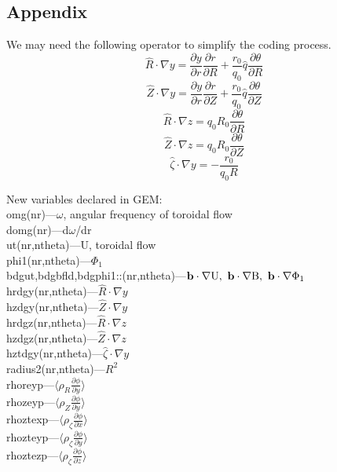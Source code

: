 \documentclass[12pt]{article}
\begin{document}
\begin{CJK*}{UTF8}{gbsn}
\section*{Appendix}\label{app}
We may need the following operator to simplify the coding process.
\begin{equation*}
    \hat{R}\cdot\nabla y = \frac{\partial y}{\partial r}\frac{\partial r}{\partial R} + \frac{r_0}{q_0}\hat{q}\frac{\partial \theta}{\partial R}
\end{equation*}
\begin{equation*}
    \hat{Z}\cdot\nabla y = \frac{\partial y}{\partial r}\frac{\partial r}{\partial Z} + \frac{r_0}{q_0}\hat{q}\frac{\partial \theta}{\partial Z}
\end{equation*}
\begin{equation*}
    \hat{R}\cdot\nabla z = q_0R_0\frac{\partial \theta}{\partial R}
\end{equation*}
\begin{equation*}
    \hat{Z}\cdot\nabla z = q_0R_0\frac{\partial \theta}{\partial Z}
\end{equation*}
\begin{equation*}
    \hat{\zeta}\cdot\nabla y = -\frac{r_0}{q_0R}
\end{equation*}

New variables declared in GEM:\\
omg(nr)---$\omega$, angular frequency of toroidal flow\\
domg(nr)---d$\omega$/dr\\
ut(nr,ntheta)---U, toroidal flow\\
phi1(nr,ntheta)---$\Phi_1$\\
bdgut,bdgbfld,bdgphi1::(nr,ntheta)---${\bf b}\cdot\nabla{\rm U},\ {\bf b}\cdot\nabla{\rm B},\ {\bf b}\cdot\nabla{\rm \Phi_1}$\\
hrdgy(nr,ntheta)---$\hat{R}\cdot\nabla y$\\
hzdgy(nr,ntheta)---$\hat{Z}\cdot\nabla y$\\
hrdgz(nr,ntheta)---$\hat{R}\cdot\nabla z$\\
hzdgz(nr,ntheta)---$\hat{Z}\cdot\nabla z$\\
hztdgy(nr,ntheta)---$\hat{\zeta}\cdot\nabla y$\\
radius2(nr,ntheta)---$R^2$\\
rhoreyp---$\big\langle\rho_R\frac{\partial\phi}{\partial y}\big\rangle$\\
rhozeyp---$\big\langle\rho_Z\frac{\partial\phi}{\partial y}\big\rangle$\\
rhoztexp---$\big\langle\rho_\zeta\frac{\partial\phi}{\partial x}\big\rangle$\\
rhozteyp---$\big\langle\rho_\zeta\frac{\partial\phi}{\partial y}\big\rangle$\\
rhoztezp---$\big\langle\rho_\zeta\frac{\partial\phi}{\partial z}\big\rangle$\\

\newpage


\end{CJK*}
\end{document}
